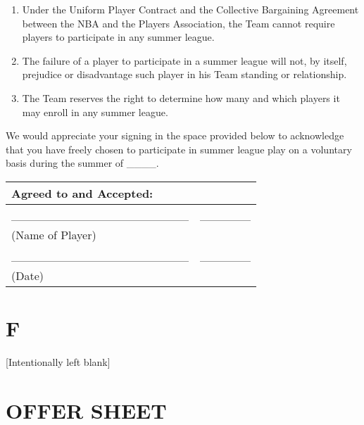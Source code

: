 \documentclass[
]{book}
\begin{document}
\begin{enumerate}
\def\labelenumi{\arabic{enumi}.}
\item
  Under the Uniform Player Contract and the Collective Bargaining Agreement between the NBA and the Players Association, the Team cannot require players to participate in any summer league.
\item
  The failure of a player to participate in a summer league will not, by itself, prejudice or disadvantage such player in his Team standing or relationship.
\item
  The Team reserves the right to determine how many and which players it may enroll in any summer league.
\end{enumerate}

We would appreciate your signing in the space provided below to acknowledge that you have freely chosen to participate in summer league play on a voluntary basis during the summer of \_\_\_\_.

\begin{longtable}[]{@{}lc@{}}
\toprule()
Agreed to and Accepted: & \\
\midrule()
\endhead
\_\_\_\_\_\_\_\_\_\_\_\_\_\_\_\_\_\_\_\_\_ & \_\_\_\_\_\_ \\
(Name of Player) & \\
\_\_\_\_\_\_\_\_\_\_\_\_\_\_\_\_\_\_\_\_\_ & \_\_\_\_\_\_ \\
(Date) & \\
\bottomrule()
\end{longtable}

\hypertarget{f}{%
\chapter{F}\label{f}}

{[}Intentionally left blank{]}

\hypertarget{offer-sheet}{%
\chapter{OFFER SHEET}\label{offer-sheet}}
\end{document}
